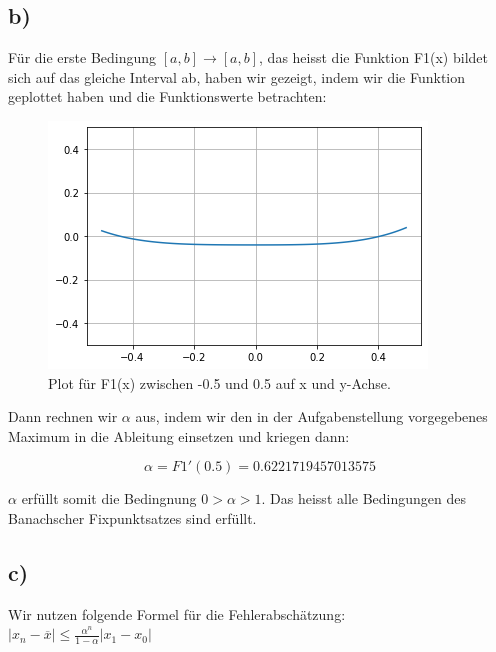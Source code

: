 \documentclass{article}
\begin{document}
\newpage

\subsection*{b)}

Für die erste Bedingung \( [a,b] \rightarrow [a,b] \), das heisst die Funktion F1(x) bildet sich auf das gleiche Interval ab, haben wir gezeigt, indem wir die Funktion geplottet haben und die Funktionswerte betrachten:
\begin{figure}[h!]
\centering
\includegraphics[scale=1]{plot_aufg1b.png}
\caption{Plot für F1(x) zwischen -0.5 und 0.5 auf x und y-Achse.}
\label{fig:plot_aufg1b.png}
\end{figure}

Dann rechnen wir \( \alpha \) aus, indem wir den in der Aufgabenstellung vorgegebenes Maximum in die Ableitung einsetzen und kriegen dann:

\[ \alpha = F1'(0.5) = 0.6221719457013575 \]

\( \alpha \) erfüllt somit die Bedingnung \( 0 > \alpha > 1 \). Das heisst alle Bedingungen des Banachscher Fixpunktsatzes sind erfüllt.

\subsection*{c)}

Wir nutzen folgende Formel für die Fehlerabschätzung:\\
\( |x_n - \overline{x}| \leq \frac{\alpha^n}{1-\alpha} |x_1 - x_0| \)
\end{document}
